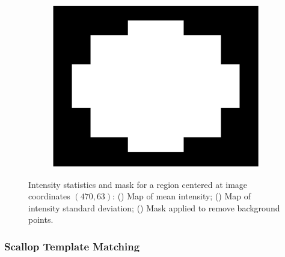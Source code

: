 \documentclass {udthesis}
\begin{document}
\begin{figure}
\begin{subfigure}[]{0.3\textwidth}
      \includegraphics[width=\textwidth]{mask_centered}
      \caption{}
      \label{subfig:mask_scallop}
  \end{subfigure}
  \caption[Illustration of scallop profile hypothesis]{Intensity statistics and mask for a region centered at image coordinates $(470,63)$: () Map of mean intensity; () Map of intensity standard deviation;
  () Mask applied to remove background points.}
  \label{fig:scallop_learning_mask}
\end{figure}


\subsubsection{Scallop Template Matching} \label{subsubsec:scallop_template_matching}
\end{document}
